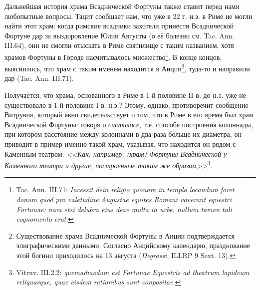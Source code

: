 

Дальнейшая история храма Всаднической Фортуны также ставит перед нами любопытные вопросы. Тацит сообщает нам, что уже в 22 г. н.э. в Риме не могли найти этот храм: когда римские всадники захотели принести Всаднической Фортуне дар за выздоровление Юлии Августы (о её болезни см. Tac. Ann. III.64), они не смогли отыскать в Риме святилище с таким названием, хотя храмов Фортуны в Городе насчитывалось множество\footnote{Tac. Ann. III.71: \textit{Incessit dein religio quonam in templo locandum foret donum quod pro valetudine Augustae equites Romani voverant equestri Fortunae: nam etsi delubra eius deae multa in urbe, nullum tamen tali cognomento erat}.}. В конце концов, выяснилось, что храм с таким именем находится в Анции\footnote{Существование храма Всаднической Фортуны в Анции подтверждается эпиграфическими данными. Согласно Анцийскому календарю, празднование этой богини приходилось на 13 августа (\textit{Degrassi}, ILLRP 9 Sext. 13).}, туда-то и направили дар (Tac. Ann. III.71).

Получается, что храма, основанного в Риме в 1-й половине II в. до н.э. уже не существовало в 1-й половине I в. н.э.? Этому, однако, противоречит сообщение Витрувия, который явно свидетельствует о том, что в Риме в его время был храм Всаднической Фортуны: говоря о \textit{систилосе}, т.е. способе построения колоннады, при котором расстояние между колоннами в два раза больше их диаметра, он приводит в пример именно такой храм, указывая, что находится он рядом с Каменным театром: \textit{<<Как, например, (храм) Фортуны Всаднической у Каменного театра и другие, построенные таким же образом>>}\footnote{Vitruv. III.2.2: \textit{quemadmodum est Fortunae Equestris ad theatrum lapideum reliquaeque, quae eisdem rationibus sunt conpositae}.}.


